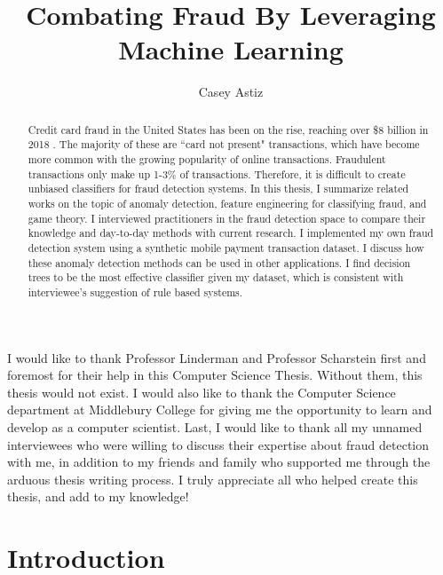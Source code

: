 \documentclass[midd]{thesis}
\title {Combating Fraud By Leveraging Machine Learning}
\author {Casey Astiz}
\begin{document}
\maketitle
{}

\begin{abstract}

Credit card fraud in the United States has been on the rise, reaching over \$8 billion in 2018 \cite{USA}. The majority of these are ``card not present" transactions, which have become more common with the growing popularity of online transactions. Fraudulent transactions only make up 1-3\% of transactions. Therefore, it is difficult to create unbiased classifiers for fraud detection systems. In this thesis, I summarize related works on the topic of anomaly detection, feature engineering for classifying fraud, and game theory. I interviewed practitioners in the fraud detection space to compare their knowledge and day-to-day methods with current research. I implemented my own fraud detection system using a synthetic mobile payment transaction dataset. I discuss how these anomaly detection methods can be used in other applications. I find decision trees to be the most effective classifier given my dataset, which is consistent with interviewee's suggestion of rule based systems.

\end{abstract}



\begin{acknowledgements}
I would like to thank Professor Linderman and Professor Scharstein first and foremost for their help in this Computer Science Thesis. Without them, this thesis would not exist. I would also like to thank the Computer Science department at Middlebury College for giving me the opportunity to learn and develop as a computer scientist. Last, I would like to thank all my unnamed interviewees who were willing to discuss their expertise about fraud detection with me, in addition to my friends and family who supported me through the arduous thesis writing process. I truly appreciate all who helped create this thesis, and add to my knowledge!

\end{acknowledgements}

\contentspage
\tablelistpage   
\figurelistpage

\normalspacing \setcounter{page}{1} 

\chapter{Introduction}
\label{sec:intro}
\end{document}
